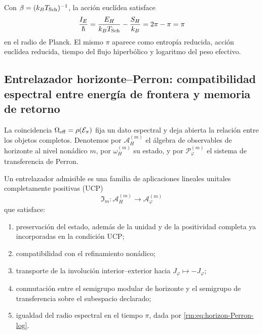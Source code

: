 Con \(\beta=(k_BT_{\rm Sch})^{-1}\), la acci\'on eucl\'idea satisface
\begin{equation}
 \frac{I_E}{\hbar}
 =\frac{E_H}{k_BT_{\rm Sch}}-\frac{S_H}{k_B}
 =2\pi-\pi=\pi
 \label{rm:eq:horizon-Schwarzschild-action}
\end{equation}
en el radio de Planck. El mismo \(\pi\) aparece como entrop\'ia reducida,
acci\'on eucl\'idea reducida, tiempo del flujo hiperb\'olico y logaritmo del
peso efectivo.

\subsection{Entrelazador horizonte–Perron: compatibilidad espectral entre energía de frontera y memoria de retorno}

La coincidencia
\(\Omega_{\rm eff}=\rho(\mathcal E_\pi)\) fija un dato espectral y deja
abierta la relaci\'on entre los objetos completos. Denotemos por
\(\mathcal A_H^{(m)}\) el \'algebra de observables de horizonte al nivel
non\'adico \(m\), por \(\omega_H^{(m)}\) su estado, y por
\(\mathcal P_\varphi^{(m)}\) el sistema de transferencia de Perron.

\begin{definition}
\label{rm:def:horizon-Perron-intertwiner}
Un entrelazador admisible es una familia de aplicaciones lineales unitales
completamente positivas (UCP)
\begin{equation}
 \mathfrak I_m:\mathcal A_H^{(m)}\longrightarrow
 \mathcal A_\varphi^{(m)}
 \label{rm:eq:horizon-intertwiner}
\end{equation}
que satisface:
\begin{enumerate}[label=\roman*)]
 \item preservaci\'on del estado, adem\'as de la unidad y de la positividad
       completa ya incorporadas en la condici\'on UCP;
 \item compatibilidad con el refinamiento non\'adico;
 \item transporte de la involuci\'on interior--exterior hacia
       \(J_\varphi\mapsto-J_\varphi\);
 \item conmutaci\'on entre el semigrupo modular de horizonte y el semigrupo
       de transferencia sobre el subespacio declarado;
 \item igualdad del radio espectral en el tiempo \(\pi\), dada por
       \cref{rm:eq:horizon-Perron-log}.
\end{enumerate}
\end{definition}

